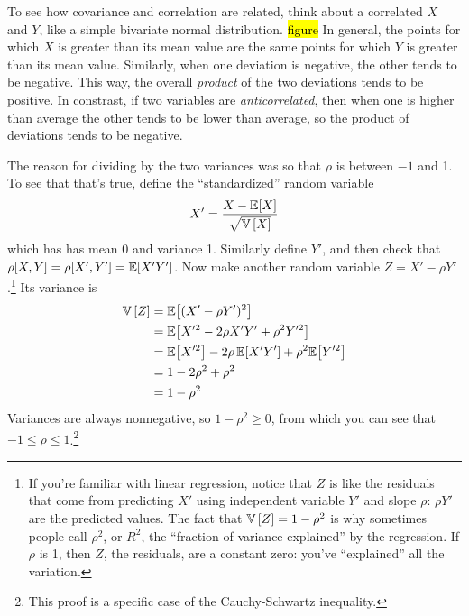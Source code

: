 To see how covariance and correlation are related, think about a correlated
$X$ and $Y$, like a simple bivariate normal distribution. \hl{figure} In
general, the points for which $X$ is greater than its mean value are the same
points for which $Y$ is greater than its mean value. Similarly, when one
deviation is negative, the other tends to be negative. This way, the overall
\emph{product} of the two deviations tends to be positive. In constrast, if
two variables are \emph{anticorrelated}, then when one is higher than average
the other tends to be lower than average, so the product of deviations tends
to be negative.

The reason for dividing by the two variances was so that $\rho$ is between
$-1$ and 1. To see that that's true, define the ``standardized'' random
variable \begin{equation} X' = \frac{X - \mathbb{E}\!\left[{X}\right]}{\sqrt{\mathbb{V}\left[{X}\right]}}
\end{equation} which has has mean 0 and variance 1. Similarly define $Y'$, and
then check that $\rho[X, Y] = \rho[X', Y'] = \mathbb{E}\!\left[{X'Y'}\right]$. Now make another
random variable $Z = X' - \rho Y'$.\footnote{If you're familiar with linear
regression, notice that $Z$ is like the residuals that come from predicting
$X'$ using independent variable $Y'$ and slope $\rho$: $\rho Y'$ are the
predicted values. The fact that $\mathbb{V}\left[{Z}\right] = 1 - \rho^2$ is why sometimes people
call $\rho^2$, or $R^2$, the ``fraction of variance explained'' by the
regression. If $\rho$ is 1, then $Z$, the residuals, are a constant zero:
you've ``explained'' all the variation.} Its variance is
\begin{align*}
\mathbb{V}\left[{Z}\right] &= \mathbb{E}\!\left[{(X' - \rho Y')^2}\right] \\
  &= \mathbb{E}\!\left[{X'^2 - 2 \rho X' Y' + \rho^2 Y'^2}\right] \\
  &= \mathbb{E}\!\left[{X'^2}\right] - 2\rho\,\mathbb{E}\!\left[{X'Y'}\right] + \rho^2 \mathbb{E}\!\left[{Y'^2}\right] \\
  &= 1 - 2\rho^2 + \rho^2 \\
  &= 1 - \rho^2
\end{align*}
Variances are always nonnegative, so $1 - \rho^2 \geq 0$, from which you can see
that $-1 \leq \rho \leq 1$.\footnote{This proof is a specific case of the
Cauchy-Schwartz inequality.}
